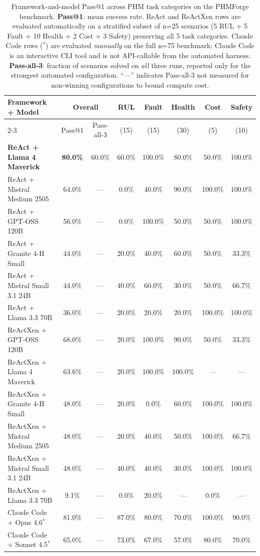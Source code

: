 \begin{table}[t]
\caption{Framework-and-model Pass@1 across PHM task categories on the PHMForge benchmark. \textbf{Pass@1}: mean success rate. ReAct and ReActXen rows are evaluated automatically on a stratified subset of n=25 scenarios (5 RUL + 5 Fault + 10 Health + 2 Cost + 3 Safety) preserving all 5 task categories. Claude Code rows ($^{*}$) are evaluated \emph{manually} on the full n=75 benchmark; Claude Code is an interactive CLI tool and is not API-callable from the automated harness. \textbf{Pass-all-3}: fraction of scenarios solved on \emph{all} three runs, reported only for the strongest automated configuration. ``---'' indicates Pass-all-3 not measured for non-winning configurations to bound compute cost.}
\label{tab:framework_performance}
\centering
\small
\setlength{\tabcolsep}{4pt}
\begin{tabular}{@{}lccccccc@{}}
\toprule
\textbf{Framework + Model} & \multicolumn{2}{c}{\textbf{Overall}} & \textbf{RUL} & \textbf{Fault} & \textbf{Health} & \textbf{Cost} & \textbf{Safety} \\
\cmidrule(lr){2-3}
& Pass@1 & Pass-all-3 & (15) & (15) & (30) & (5) & (10) \\
\midrule
\rowcolor{highlight}
\textbf{ReAct + Llama 4 Maverick} & \textbf{80.0\%} & 60.0\% & 60.0\% & 100.0\% & 80.0\% & 50.0\% & 100.0\% \\
ReAct + Mistral Medium 2505 & 64.0\% & --- & 0.0\% & 40.0\% & 90.0\% & 100.0\% & 100.0\% \\
ReAct + GPT-OSS 120B & 56.0\% & --- & 0.0\% & 100.0\% & 50.0\% & 50.0\% & 100.0\% \\
ReAct + Granite 4-H Small & 44.0\% & --- & 20.0\% & 40.0\% & 60.0\% & 50.0\% & 33.3\% \\
ReAct + Mistral Small 3.1 24B & 44.0\% & --- & 40.0\% & 60.0\% & 30.0\% & 50.0\% & 66.7\% \\
ReAct + Llama 3.3 70B & 36.0\% & --- & 20.0\% & 20.0\% & 20.0\% & 100.0\% & 100.0\% \\
\midrule
ReActXen + GPT-OSS 120B & 68.0\% & --- & 20.0\% & 100.0\% & 90.0\% & 50.0\% & 33.3\% \\
ReActXen + Llama 4 Maverick & 63.6\% & --- & 20.0\% & 100.0\% & 100.0\% & --- & --- \\
ReActXen + Granite 4-H Small & 48.0\% & --- & 20.0\% & 0.0\% & 60.0\% & 100.0\% & 100.0\% \\
ReActXen + Mistral Medium 2505 & 48.0\% & --- & 20.0\% & 40.0\% & 50.0\% & 100.0\% & 66.7\% \\
ReActXen + Mistral Small 3.1 24B & 48.0\% & --- & 40.0\% & 40.0\% & 30.0\% & 100.0\% & 100.0\% \\
ReActXen + Llama 3.3 70B & 9.1\% & --- & 0.0\% & 20.0\% & --- & 0.0\% & --- \\
\midrule
Claude Code + Opus 4.6$^{*}$ & 81.0\% & --- & 87.0\% & 80.0\% & 70.0\% & 100.0\% & 90.0\% \\
Claude Code + Sonnet 4.5$^{*}$ & 65.0\% & --- & 73.0\% & 67.0\% & 57.0\% & 80.0\% & 70.0\% \\
\bottomrule
\end{tabular}
\end{table}